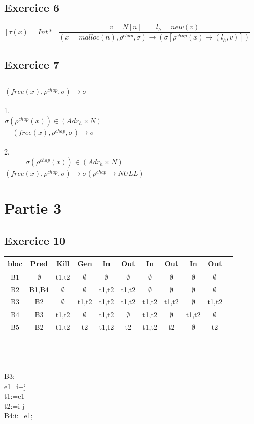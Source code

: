 \documentclass[10pt,a4paper]{article}
\begin{document}
\subsection{Exercice 6}

$ [\tau(x)=Int*] \dfrac{v=N[n] \qquad l_h = new(v)}{(x=malloc(n),\rho^{chap},\sigma) \rightarrow (\sigma[\rho^{chap}(x) \rightarrow (l_h,v)])}$
\subsection{Exercice 7}
$\dfrac{}{(free(x),\rho^{chap},\sigma) \rightarrow \sigma}$
\\\\
1.\\
$\dfrac{\sigma(\rho^{chap}( x))\in (Adr_h \times N)}
{(free(x),\rho^{chap},\sigma) \rightarrow \sigma}$
\\
\\
2.\\
$\dfrac{\sigma(\rho^{chap}( x))\in (Adr_h \times N)}
{(free(x),\rho^{chap},\sigma) \rightarrow \sigma(\rho^{chap} \rightarrow NULL)}$
\section{Partie 3}
\subsection{Exercice 10}
\begin{tabular}{|c|c|c|c|c|c|c|c|c|c|c|}
\hline 
bloc & Pred & Kill & Gen & In & Out & In & Out & In & Out \\ 
\hline 
B1 & $\emptyset$ & t1,t2 & $\emptyset$ & $\emptyset$ & $\emptyset$ & $\emptyset$ & $\emptyset$ & $\emptyset$ & $\emptyset$ \\ 
\hline 
B2 & B1,B4 & $\emptyset$ & $\emptyset$ & t1,t2 & t1,t2 & $\emptyset$ & $\emptyset$ & $\emptyset$ & $\emptyset$ \\ 
\hline 
B3 & B2 & $\emptyset$ & t1,t2 & t1,t2 & t1,t2 & t1,t2 & t1,t2 & $\emptyset$ & t1,t2 \\ 
\hline 
B4 & B3 & t1,t2 & $\emptyset$ & t1,t2 & $\emptyset$ & t1,t2 & $\emptyset$ & t1,t2 & $\emptyset$ \\ 
\hline 
B5 & B2 & t1,t2 & t2 & t1,t2 & t2 & t1,t2 & t2 & $\emptyset$ & t2  \\ 
\hline 
\end{tabular} 
\\
\\
\\
B3:\\
e1=i+j\\
t1:=e1\\
t2:=i-j\\
B4:i:=e1;\\
\end{document}
